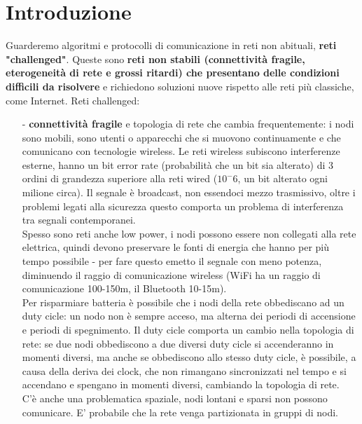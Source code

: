 \documentclass[12pt,italian]{report}
\begin{document}
\frontespizio 

\beforepreface
\afterpreface

\chapter{Introduzione}
\label{cap:introduzione}
Guarderemo algoritmi e protocolli di comunicazione in reti non abituali, \textbf{reti "challenged"}. Queste sono \textbf{reti non stabili (connettività fragile, eterogeneità di rete e grossi ritardi) che presentano delle condizioni difficili da risolvere} e richiedono soluzioni nuove rispetto alle reti più classiche, come Internet. 
\bigbreak
\noindent Reti challenged:
\begin{itemize}
    \item[-] \textbf{connettività fragile }e topologia di rete che cambia frequentemente: i nodi sono mobili, sono utenti o apparecchi che si muovono continuamente e che comunicano con tecnologie wireless. Le reti wireless subiscono interferenze esterne, hanno un bit error rate (probabilità che un bit sia alterato) di 3 ordini di grandezza superiore alla reti wired ($10^-6$, un bit alterato ogni milione circa). Il segnale è broadcast, non essendoci mezzo trasmissivo, oltre i problemi legati alla sicurezza questo comporta un problema di interferenza tra segnali contemporanei. \\ Spesso sono reti anche low power, i nodi possono essere non collegati alla rete elettrica, quindi devono preservare le fonti di energia che hanno per più tempo possibile - per fare questo emetto il segnale con meno potenza, diminuendo il raggio di comunicazione wireless (WiFi ha un raggio di comunicazione 100-150m, il Bluetooth 10-15m).\\ Per risparmiare batteria è possibile che i nodi della rete obbediscano ad un duty cicle: un nodo non è sempre acceso, ma alterna dei periodi di accensione e periodi di spegnimento. Il duty cicle comporta un cambio nella topologia di rete: se due nodi obbediscono a due diversi duty cicle si accenderanno in momenti diversi, ma anche se obbediscono allo stesso duty cicle, è possibile, a causa della deriva dei clock, che non rimangano sincronizzati nel tempo e si accendano e spengano in momenti diversi, cambiando la topologia di rete. \\
    C'è anche una problematica spaziale, nodi lontani e sparsi non possono comunicare. E' probabile che la rete venga partizionata in gruppi di nodi.
  

\end{itemize}
\end{document}
